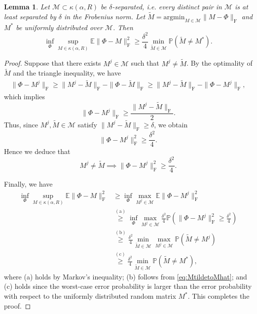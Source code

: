 \documentclass[11pt]{article}
\newtheorem{lemma}{Lemma}[section]
\newcommand{\E}{\mathbb{E}}
\begin{document}
\begin{lemma}
Let $\mathcal{M} \subset \kappa(\alpha,R)$ be $\delta$-separated, i.e. every distinct pair in $\mathcal{M}$ is at least separated by $\delta$ in the Frobenius norm. 
Let $\widetilde{M} = \mathrm{arg min}_{M \in \mathcal{M}} \|M - \Phi\|_\mathrm{F}$ and $M^*$ be uniformly distributed over $\mathcal{M}$. 
Then 
\begin{equation*}
    \inf_{\Phi} \sup_{M \in \kappa(\alpha,R)} \E \|\Phi - M\|_\mathrm{F}^2 
    \geq 
    \frac{\delta^2}{4} \min_{\widetilde{M} \in \mathcal{M}} \mathbb{P}( \widetilde{M} \neq M^* ). 
\end{equation*} 
\end{lemma}

\begin{proof}
Suppose that there exists $M^j \in \mathcal{M}$ such that $M^j \neq \widetilde{M}$. 
By the optimality of $\widetilde{M}$ and the triangle inequality, we have
\begin{align*}
    \|\Phi - M^j\|_\mathrm{F} 
    \geq \|M^j - \widetilde{M}\|_\mathrm{F} - \|\Phi - \widetilde{M}\|_\mathrm{F}
    \geq \|M^j - \widetilde{M}\|_\mathrm{F} - \|\Phi - M^j\|_\mathrm{F},
\end{align*}
which implies
\[
    \|\Phi - M^j\|_\mathrm{F} 
    \geq \frac{\|M^j - \widetilde{M}\|_\mathrm{F}}{2}.
\]
Thus, since $M^j, \widetilde{M} \in \mathcal{M}$ satisfy $\|M^j - \widetilde{M}\|_\mathrm{F} \geq \delta$, we obtain
\[
    \|\Phi - M^j\|_\mathrm{F}^2 \geq \frac{\delta^2}{4}.
\]
Hence we deduce that
\begin{equation}
    M^j \neq \widetilde{M} 
    \implies 
    \|\Phi - M^j\|_\mathrm{F}^2
    \geq \frac{\delta^2}{4}.
    \label{eq:MtildetoMhat}
\end{equation}

Finally, we have 
\begin{align*}
    \inf_{\Phi} \sup_{M \in \kappa(\alpha,R)} \E \|\Phi - M\|_\mathrm{F}^2 
    & \geq \inf_{\Phi} \max_{M^j \in \mathcal{M}} \E \|\Phi - M^j\|_\mathrm{F}^2 \\
    & \overset{\mathrm{(a)}}{\geq} \inf_{\Phi} \max_{M^j \in \mathcal{M}} \frac{\delta^2}{4} \mathbb{P}\left( \|\Phi - M^j\|_\mathrm{F}^2 \geq \frac{\delta^2}{4} \right) \\
    & \overset{\mathrm{(b)}}{\geq} \frac{\delta^2}{4} \min_{\widetilde{M} \in \mathcal{M}} \max_{M^j \in \mathcal{M}} \mathbb{P}( \widetilde{M} \neq M^j ) \\
    & \overset{\mathrm{(c)}}{\geq} \frac{\delta^2}{4} \min_{\widetilde{M} \in \mathcal{M}} \mathbb{P}( \widetilde{M} \neq M^* ),
\end{align*} 
where (a) holds by Markov's inequality; (b) follows from \eqref{eq:MtildetoMhat}; and (c) holds since the worst-case error probability is larger than the error probability with respect to the uniformly distributed random matrix $M^*$.
This completes the proof.
\end{proof}
\end{document}
